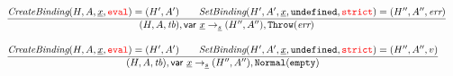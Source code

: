 \documentclass[a4paper, leqno]{amsart}
\newcommand{\rulesep}{\quad\quad}
\newcommand{\stmt}{s}
\newcommand{\ir}[1]{\ensuremath{\underline{#1}}}
\newcommand{\irid}{\ir{x}}
\def\inred{\color{red}}
\newcommand{\strict}{{\inred\tt strict}}
\newcommand{\eval}{{\inred\tt eval}}
\newcommand{\undef}{{\tt undefined}}
\newcommand{\tb}{\emph{tb}}
\newcommand{\err}{\emph{err}}
\newcommand{\hf}[1]{\emph{#1}}
\newcommand{\void}{{\tt Normal}({\tt empty})}
\newcommand{\error}{\ensuremath{{\tt Throw}(\err)}}
\newcommand{\state}{\ensuremath{(H,A,\tb)}}
\newcommand{\resp}{\ensuremath{(H',A')}}
\newcommand{\respp}{\ensuremath{(H'',A'')}}
\def\inred{\color{red}}
\begin{document}
\[\begin{array}{l@{~~}l@{~~}ll}
\frac{\begin{matrix}
\hf{CreateBinding}(H, A, \irid, \eval) = \resp
\rulesep
\hf{SetBinding}(H', A', \irid, \undef, \strict) = (H'', A'', \err)
\end{matrix}}{\begin{matrix}
\state, {\sf var} \ \irid \rightarrow_{\ir\stmt}
\respp, \error
\end{matrix}}\\[2em]

\frac{\begin{matrix}
\hf{CreateBinding}(H, A, \irid, \eval) = \resp
\rulesep
\hf{SetBinding}(H', A', \irid, \undef, \strict) = (H'', A'', v)
\end{matrix}}{\begin{matrix}
\state, {\sf var} \ \irid \rightarrow_{\ir\stmt}
\respp, \void
\end{matrix}}\\[2em]

\end{array}
\]
\end{document}
